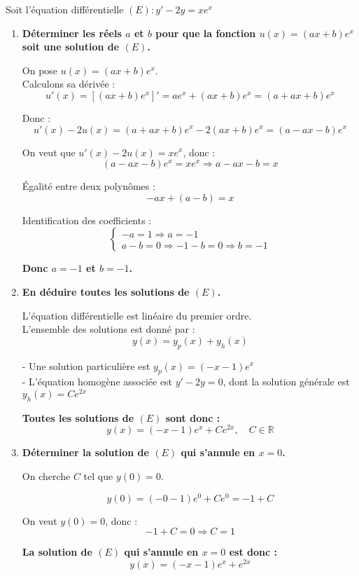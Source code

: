 \documentclass[a4paper,12pt]{article}
\begin{document}
Soit l’équation différentielle \((E) : y' - 2y = xe^x\)

\begin{enumerate}
    \item \textbf{Déterminer les réels \(a\) et \(b\) pour que la fonction \(u(x) = (ax + b)e^x\) soit une solution de \((E)\).}

    On pose \(u(x) = (ax + b)e^x\).\\

    Calculons sa dérivée :
    \[
    u'(x) = \left[(ax + b)e^x\right]' = a e^x + (ax + b) e^x = (a + ax + b) e^x
    \]

    Donc :
    \[
    u'(x) - 2u(x) = (a + ax + b)e^x - 2(ax + b)e^x = (a - ax - b)e^x
    \]

    On veut que \(u'(x) - 2u(x) = xe^x\), donc :
    \[
    (a - ax - b)e^x = xe^x \Rightarrow a - ax - b = x
    \]

    Égalité entre deux polynômes :
    \[
    -a x + (a - b) = x
    \]

    Identification des coefficients :
    \[
    \begin{cases}
    -a = 1 \Rightarrow a = -1 \\
    a - b = 0 \Rightarrow -1 - b = 0 \Rightarrow b = -1
    \end{cases}
    \]

    \textbf{Donc \(a = -1\) et \(b = -1\).}

    \item \textbf{En déduire toutes les solutions de \((E)\).}

    L’équation différentielle est linéaire du premier ordre.\\
    L’ensemble des solutions est donné par :
    \[
    y(x) = y_p(x) + y_h(x)
    \]

    - Une solution particulière est \(y_p(x) = (-x - 1)e^x\) \\
    - L’équation homogène associée est \(y' - 2y = 0\), dont la solution générale est \(y_h(x) = Ce^{2x}\)

    \textbf{Toutes les solutions de \((E)\) sont donc :}
    \[
    \boxed{y(x) = (-x - 1)e^x + Ce^{2x}, \quad C \in \mathbb{R}}
    \]

    \item \textbf{Déterminer la solution de \((E)\) qui s’annule en \(x = 0\).}

    On cherche \(C\) tel que \(y(0) = 0\).

    \[
    y(0) = (-0 - 1)e^0 + Ce^{0} = -1 + C
    \]

    On veut \(y(0) = 0\), donc :
    \[
    -1 + C = 0 \Rightarrow C = 1
    \]

    \textbf{La solution de \((E)\) qui s’annule en \(x = 0\) est donc :}
    \[
    \boxed{y(x) = (-x - 1)e^x + e^{2x}}
    \]
\end{enumerate}
\end{document}
